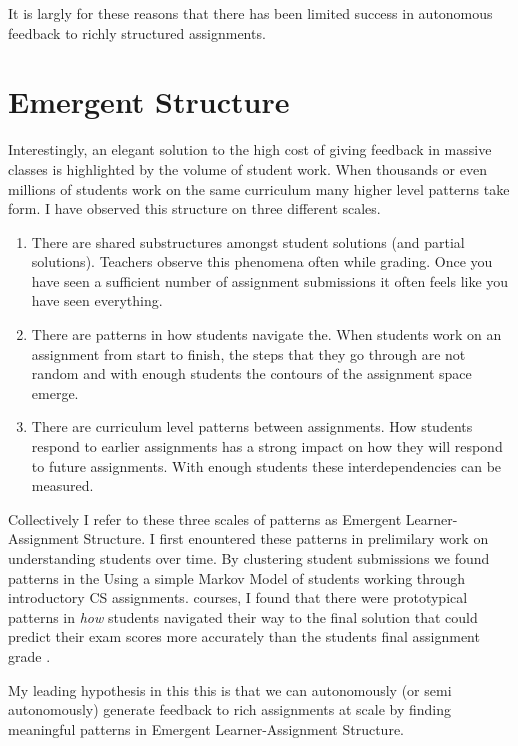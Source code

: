 It is largly for these reasons that there has been limited success in autonomous feedback to richly structured assignments.

\section{Emergent Structure}

Interestingly, an elegant solution to the high cost of giving feedback in massive classes is highlighted by the volume of student work. When thousands or even millions of students work on the same curriculum many higher level patterns take form. I have observed this structure on three different scales. 
\begin{enumerate}
\item There are shared substructures amongst student solutions (and partial solutions). Teachers observe this phenomena often while grading. Once you have seen a sufficient number of assignment submissions it often feels like you have seen everything. 
\item There are patterns in how students navigate the. When students work on an assignment from start to finish, the steps that they go through are not random and with enough students the contours of the assignment space emerge. 
\item There are curriculum level patterns between assignments. How students respond to earlier assignments has a strong impact on how they will respond to future assignments. With enough students these interdependencies can be measured.
\end{enumerate}
Collectively I refer to these three scales of patterns as Emergent Learner-Assignment Structure. I first enountered these patterns in prelimilary work on understanding students over time. By clustering student submissions we found patterns in the Using a simple Markov Model of students working through introductory CS assignments. courses, I found that there were prototypical patterns in \emph{how} students navigated their way to the final solution that could predict their exam scores more accurately than the students final assignment grade \cite{piech2012modeling}. 

\begin{mdframed}
My leading hypothesis in this this is that we can autonomously (or semi autonomously) generate feedback to rich assignments at scale by finding meaningful patterns in Emergent Learner-Assignment Structure. 
\end{mdframed}

